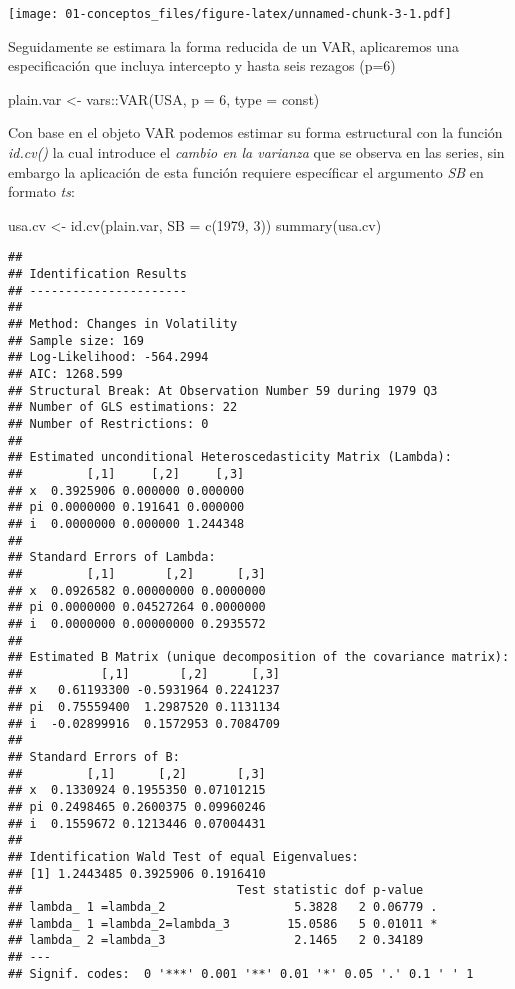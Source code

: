 \documentclass[
]{book}
\newenvironment{Shaded}{\begin{snugshade}}{\end{snugshade}}
\newcommand{\AttributeTok}[1]{\textcolor[rgb]{0.77,0.63,0.00}{#1}}
\newcommand{\DecValTok}[1]{\textcolor[rgb]{0.00,0.00,0.81}{#1}}
\newcommand{\FunctionTok}[1]{\textcolor[rgb]{0.00,0.00,0.00}{#1}}
\newcommand{\NormalTok}[1]{#1}
\newcommand{\OtherTok}[1]{\textcolor[rgb]{0.56,0.35,0.01}{#1}}
\newcommand{\SpecialCharTok}[1]{\textcolor[rgb]{0.00,0.00,0.00}{#1}}
\newcommand{\StringTok}[1]{\textcolor[rgb]{0.31,0.60,0.02}{#1}}
\begin{document}
\texttt{[image: 01-conceptos\_files/figure-latex/unnamed-chunk-3-1.pdf]}

Seguidamente se estimara la forma reducida de un VAR, aplicaremos una especificación que incluya intercepto y hasta seis rezagos (p=6)

\begin{Shaded}
\begin{Highlighting}[]
\NormalTok{plain.var }\OtherTok{\textless{}{-}}\NormalTok{ vars}\SpecialCharTok{::}\FunctionTok{VAR}\NormalTok{(USA, }\AttributeTok{p =} \DecValTok{6}\NormalTok{, }\AttributeTok{type =} \StringTok{\textquotesingle{}const\textquotesingle{}}\NormalTok{)}
\end{Highlighting}
\end{Shaded}

Con base en el objeto VAR podemos estimar su forma estructural con la función \emph{id.cv()} la cual introduce el \emph{cambio en la varianza} que se observa en las series, sin embargo la aplicación de esta función requiere específicar el argumento \emph{SB} en formato \emph{ts}:

\begin{Shaded}
\begin{Highlighting}[]
\NormalTok{usa.cv }\OtherTok{\textless{}{-}} \FunctionTok{id.cv}\NormalTok{(plain.var, }\AttributeTok{SB =} \FunctionTok{c}\NormalTok{(}\DecValTok{1979}\NormalTok{, }\DecValTok{3}\NormalTok{))}
\FunctionTok{summary}\NormalTok{(usa.cv)}
\end{Highlighting}
\end{Shaded}

\begin{verbatim}
## 
## Identification Results
## ---------------------- 
## 
## Method: Changes in Volatility
## Sample size: 169
## Log-Likelihood: -564.2994
## AIC: 1268.599
## Structural Break: At Observation Number 59 during 1979 Q3
## Number of GLS estimations: 22
## Number of Restrictions: 0
## 
## Estimated unconditional Heteroscedasticity Matrix (Lambda):
##         [,1]     [,2]     [,3]
## x  0.3925906 0.000000 0.000000
## pi 0.0000000 0.191641 0.000000
## i  0.0000000 0.000000 1.244348
## 
## Standard Errors of Lambda:
##         [,1]       [,2]      [,3]
## x  0.0926582 0.00000000 0.0000000
## pi 0.0000000 0.04527264 0.0000000
## i  0.0000000 0.00000000 0.2935572
## 
## Estimated B Matrix (unique decomposition of the covariance matrix): 
##           [,1]       [,2]      [,3]
## x   0.61193300 -0.5931964 0.2241237
## pi  0.75559400  1.2987520 0.1131134
## i  -0.02899916  0.1572953 0.7084709
## 
## Standard Errors of B:
##         [,1]      [,2]       [,3]
## x  0.1330924 0.1955350 0.07101215
## pi 0.2498465 0.2600375 0.09960246
## i  0.1559672 0.1213446 0.07004431
## 
## Identification Wald Test of equal Eigenvalues:
## [1] 1.2443485 0.3925906 0.1916410
##                              Test statistic dof p-value  
## lambda_ 1 =lambda_2                  5.3828   2 0.06779 .
## lambda_ 1 =lambda_2=lambda_3        15.0586   5 0.01011 *
## lambda_ 2 =lambda_3                  2.1465   2 0.34189  
## ---
## Signif. codes:  0 '***' 0.001 '**' 0.01 '*' 0.05 '.' 0.1 ' ' 1
\end{verbatim}
\end{document}

